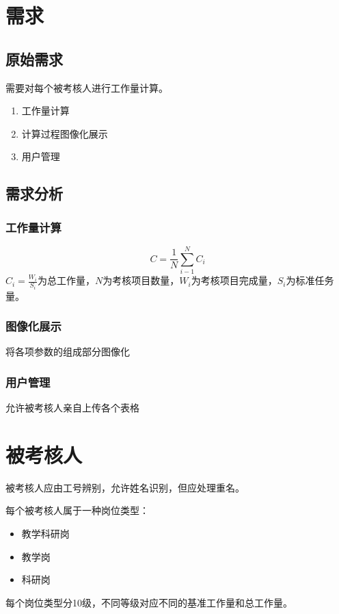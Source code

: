 \documentclass[UTF8,fontset=windowsnew]{ctexart}
\begin{document}
\songti

\section{需求}
\subsection{原始需求}
需要对每个被考核人进行工作量计算。
\begin{enumerate}
    \item 工作量计算
    \item 计算过程图像化展示
    \item 用户管理
\end{enumerate}
\subsection{需求分析}
\subsubsection{工作量计算}
\begin{equation}
  C=\frac{1}{N}\sum_{i-1}^NC_i\label{eq:main}
\end{equation}
$C_i=\frac{W_i}{S_i}$为总工作量，$N$为考核项目数量，$W_i$为考核项目完成量，$S_i$为标准任务量。\par
\subsubsection{图像化展示}
将各项参数的组成部分图像化
\subsubsection{用户管理}
允许被考核人亲自上传各个表格
\section{被考核人}
被考核人应由工号辨别，允许姓名识别，但应处理重名。\par
每个被考核人属于一种岗位类型：\par
\begin{itemize}
  \item 教学科研岗
  \item 教学岗
  \item 科研岗
\end{itemize}
每个岗位类型分10级，不同等级对应不同的基准工作量和总工作量。
\end{document}
